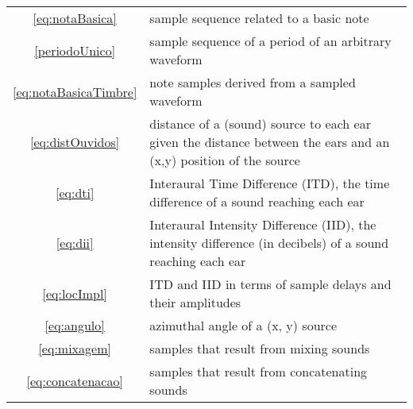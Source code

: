 \documentclass{scrreprt}
\begin{document}
\begin{table*}[htp!]
\begin{tabular}{ c | p{12cm} }
 \ref{eq:notaBasica} & sample sequence related to a basic note \\
 \ref{periodoUnico} & sample sequence of a period of an arbitrary waveform \\
 \ref{eq:notaBasicaTimbre} & note samples derived from a sampled waveform \\
 \ref{eq:distOuvidos} & distance of a (sound) source to each ear given the distance between the ears and an (x,y) position of the source \\
 \ref{eq:dti} & Interaural Time Difference (ITD), the time difference of a sound reaching each ear \\
 \ref{eq:dii} & Interaural Intensity Difference (IID), the intensity difference (in decibels) of a sound reaching each ear \\
 \ref{eq:locImpl} & ITD and IID in terms of sample delays and their amplitudes \\
 \ref{eq:angulo} & azimuthal angle of a (x, y) source \\
 \ref{eq:mixagem} & samples that result from mixing sounds \\
 \ref{eq:concatenacao} & samples that result from concatenating sounds \\
\end{tabular}
\end{table*}
\end{document}
